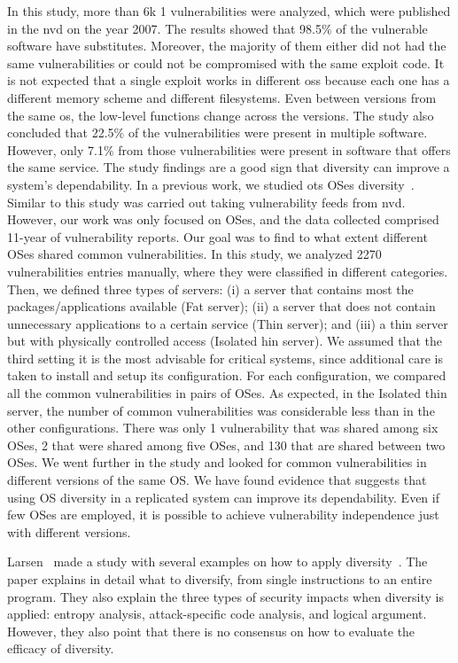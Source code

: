 In this study, more than 6k 1 vulnerabilities were analyzed, which were published in the \gls{nvd} on the year 2007. 
The results showed that 98.5$\%$ of the vulnerable software have substitutes. 
Moreover, the majority of them either did not had the same vulnerabilities or could not be compromised with the same exploit code. 
It is not expected that a single exploit works in different \glspl{os} because each one has a different memory scheme and different filesystems. 
Even between versions from the same \gls{os}, the low-level functions change across the versions. 
The study also concluded that 22.5$\%$ of the vulnerabilities were present in multiple software. 
However, only 7.1$\%$ from those vulnerabilities were present in software that offers the same service. 
The study findings are a good sign that diversity can improve a system’s dependability.
In a previous work, we studied \gls{ots} OSes diversity~\cite{Garcia:2014}. 
Similar to \cite{Han:2009} this study was carried out taking vulnerability feeds from \gls{nvd}. 
However, our work was only focused on OSes, and the data collected comprised 11-year of vulnerability reports. 
Our goal was to find to what extent different OSes shared common vulnerabilities. 
In this study, we analyzed 2270 vulnerabilities entries manually, where they were classified in different categories. 
Then, we defined three types of servers: (i) a server that contains most the packages/applications available (Fat server); (ii) a server that does not contain unnecessary applications to a certain
service (Thin server); and (iii) a thin server but with physically controlled access (Isolated hin server). 
We assumed that the third setting it is the most advisable for critical systems, since additional care is taken to install and setup its configuration. 
For each configuration, we compared all the common vulnerabilities in pairs of OSes. 
As expected, in the Isolated thin server, the number of common vulnerabilities was considerable less than in the other configurations. 
There was only 1 vulnerability that was shared among six OSes, 2 that were shared among five OSes, and 130 that are shared between two OSes. 
We went further in the study and looked for common vulnerabilities in different versions of the same OS. 
We have found evidence that suggests that using OS diversity in a replicated system can improve its dependability. 
Even if few OSes are employed, it is possible to achieve vulnerability independence just with different versions.



Larsen~\etal{} made a study with several examples on how to apply diversity~\cite{Larsen:2014,Larsen:2015}. 
The paper explains in detail what to diversify, from single instructions to an entire program. 
They also explain the three types of security impacts when diversity is applied: entropy analysis, attack-specific code analysis, and logical argument. 
However, they also point that there is no consensus on how to evaluate the efficacy of diversity. 



